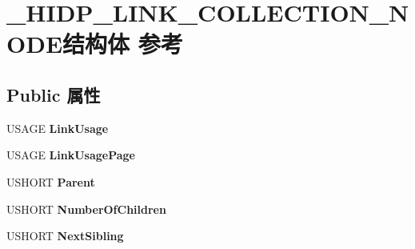 \hypertarget{struct___h_i_d_p___l_i_n_k___c_o_l_l_e_c_t_i_o_n___n_o_d_e}{}\section{\+\_\+\+H\+I\+D\+P\+\_\+\+L\+I\+N\+K\+\_\+\+C\+O\+L\+L\+E\+C\+T\+I\+O\+N\+\_\+\+N\+O\+D\+E结构体 参考}
\label{struct___h_i_d_p___l_i_n_k___c_o_l_l_e_c_t_i_o_n___n_o_d_e}
\subsection*{Public 属性}
\begin{DoxyCompactItemize}
\item 
\mbox{\label{struct___h_i_d_p___l_i_n_k___c_o_l_l_e_c_t_i_o_n___n_o_d_e_a3997a731454eaeb4eb738dd4c67caf91}} 
U\+S\+A\+GE {\bfseries Link\+Usage}
\item 
\mbox{\label{struct___h_i_d_p___l_i_n_k___c_o_l_l_e_c_t_i_o_n___n_o_d_e_ab7ff48ba056b744f43281d15419c490b}} 
U\+S\+A\+GE {\bfseries Link\+Usage\+Page}
\item 
\mbox{\label{struct___h_i_d_p___l_i_n_k___c_o_l_l_e_c_t_i_o_n___n_o_d_e_aac866ead8e77e74c3ab094812ecf2bca}} 
U\+S\+H\+O\+RT {\bfseries Parent}
\item 
\mbox{\label{struct___h_i_d_p___l_i_n_k___c_o_l_l_e_c_t_i_o_n___n_o_d_e_a4e882b86797a92d3a132affd96997ec1}} 
U\+S\+H\+O\+RT {\bfseries Number\+Of\+Children}
\item 
\mbox{\label{struct___h_i_d_p___l_i_n_k___c_o_l_l_e_c_t_i_o_n___n_o_d_e_a7b0b69ee491cc5d0e705e03408a14ca3}} 
U\+S\+H\+O\+RT {\bfseries Next\+Sibling}
\item 
\mbox{\label{struct___h_i_d_p___l_i_n_k___c_o_l_l_e_c_t_i_o_n___n_o_d_e_ada9ffabf7531da48d95e60eee00c1681}} 

\end{DoxyCompactItemize}

